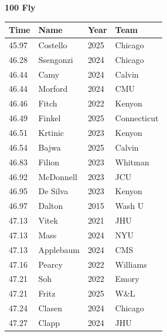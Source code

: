 \noindent\begin{minipage}[t]{0.98\textwidth}
\centering
\textbf{\textcolor{teamprimary}{100 Fly}}\par
\vspace{0.5em}
\centering
\small
\renewcommand{\arraystretch}{1.0}
\setlength{\tabcolsep}{4pt}
\begin{tabular}{@{}p{2.5cm}p{4.5cm}p{1.5cm}p{2.5cm}@{}}
\toprule
\textbf{Time} & \textbf{Name} & \textbf{Year} & \textbf{Team} \\
\midrule
45.97 & Costello & 2025 & Chicago \\
46.28 & Ssengonzi & 2024 & Chicago \\
46.44 & Camy & 2024 & Calvin \\
46.44 & Morford & 2024 & CMU \\
46.46 & Fitch & 2022 & Kenyon \\
46.49 & Finkel & 2025 & Connecticut \\
46.51 & Krtinic & 2023 & Kenyon \\
46.54 & Bajwa & 2025 & Calvin \\
46.83 & Filion & 2023 & Whitman \\
46.92 & McDonnell & 2023 & JCU \\
46.95 & De Silva & 2023 & Kenyon \\
46.97 & Dalton & 2015 & Wash U \\
47.13 & Vitek & 2021 & JHU \\
47.13 & Mass & 2024 & NYU \\
47.13 & Applebaum & 2024 & CMS \\
47.16 & Pearcy & 2022 & Williams \\
47.21 & Soh & 2022 & Emory \\
47.21 & Fritz & 2025 & W\&L \\
47.24 & Clasen & 2024 & Chicago \\
47.27 & Clapp & 2024 & JHU \\
\bottomrule
\end{tabular}
\end{minipage}
\vspace{1.2em}
